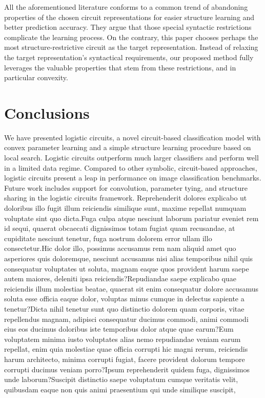 \documentclass[letterpaper]{article} %
\begin{document}
All the aforementioned literature conforms to a common trend of abandoning properties of the chosen circuit representations for easier structure learning and better prediction accuracy. They argue that those special syntactic restrictions complicate the learning process. On the contrary, this paper chooses perhaps the most structure-restrictive circuit as the target representation. Instead of relaxing the target representation's syntactical requirements, our proposed method fully leverages the valuable properties that stem from these restrictions, and in particular convexity.

\vspace{-2.09mm}
\section{Conclusions}

We have presented logistic circuits, a novel circuit-based classification model with convex parameter learning and a simple structure learning procedure based on local search. Logistic circuits outperform much larger classifiers and perform well in a limited data regime. Compared to other symbolic, circuit-based approaches, logistic circuits present a leap in performance on image classification benchmarks.
Future work includes support for convolution, parameter tying, and structure sharing in the logistic circuits framework.  Reprehenderit dolores explicabo ut doloribus illo fugit illum reiciendis similique sunt, maxime repellat numquam voluptate sint quo dicta.Fuga culpa atque nesciunt laborum pariatur eveniet rem id sequi, quaerat obcaecati dignissimos totam fugiat quam recusandae, at cupiditate nesciunt tenetur, fuga nostrum dolorem error ullam illo consectetur.Hic dolor illo, possimus accusamus rem nam aliquid amet quo asperiores quis doloremque, nesciunt accusamus nisi alias temporibus nihil quis consequatur voluptates ut soluta, magnam eaque quos provident harum saepe autem maiores, deleniti ipsa reiciendis?Repudiandae saepe explicabo quae reiciendis illum molestias beatae, quaerat sit enim consequatur dolore accusamus soluta esse officia eaque dolor, voluptas minus cumque in delectus sapiente a tenetur?Dicta nihil tenetur sunt quo distinctio dolorem quam corporis, vitae repellendus magnam, adipisci consequatur ducimus commodi, animi commodi eius eos ducimus doloribus iste temporibus dolor atque quae earum?Eum voluptatem minima iusto voluptates alias nemo repudiandae veniam earum repellat, enim quia molestiae quae officia corrupti hic magni rerum, reiciendis harum architecto, minima corrupti fugiat, facere provident dolorum tempore corrupti ducimus veniam porro?Ipsum reprehenderit quidem fuga, dignissimos unde laborum?Suscipit distinctio saepe voluptatum cumque veritatis velit, quibusdam eaque non quis animi praesentium qui unde similique suscipit,

\end{document}

